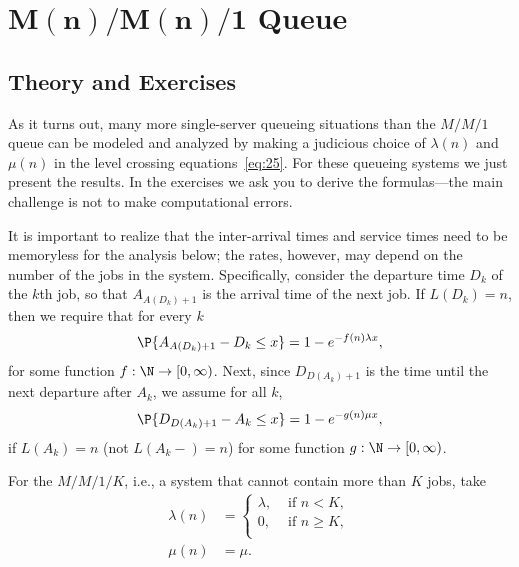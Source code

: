 \section
[$M(n)/M(n)/1$ Queue]
{$\mathbf{M(n)/M(n)/1}$ Queue}
\label{sec:mnmn1}

\subsection*{Theory and Exercises}


As it turns out, many more single-server queueing situations than the $M/M/1$ queue can be modeled and analyzed by making a judicious choice of $\lambda(n)$ and $\mu(n)$ in the level crossing equations~\eqref{eq:25}.
For these queueing systems we just present the results.
In the exercises we ask you to derive the formulas---the main challenge is not to make computational errors.

It is important to realize that the inter-arrival times and service times need to be memoryless for the analysis below; the rates, however, may  depend on the number of the jobs in the system. Specifically, consider the departure time $D_k$ of the $k$th job, so that $A_{A(D_k)+1}$ is the arrival time of the next job. If $L(D_k)=n$, then we require that for every $k$ 
\begin{equation*}
  \P{A_{A(D_k)+1} - D_k \leq x} = 1-e^{-f(n) \lambda x},
\end{equation*}
for some function $f:\N\to [0,\infty)$. Next, since $D_{D(A_k)+1}$ is the time until the next departure after $A_k$, we assume for all $k$,
\begin{equation*}
  \P{D_{D(A_k)+1} - A_k \leq x} = 1-e^{-g(n) \mu x},
\end{equation*}
if $L(A_k)=n$ (not $L(A_k-)=n$) for some function $g:\N \to [0,\infty)$. 


For the $M/M/1/K$, i.e., a system that cannot contain more than $K$ jobs, take
  \begin{align*}
    \lambda(n) &= 
  \begin{cases}
    \lambda, &\text{ if } n < K, \\
    0, &\text{ if } n \geq K, \\
  \end{cases} \\
\mu(n) &= \mu.
  \end{align*}

